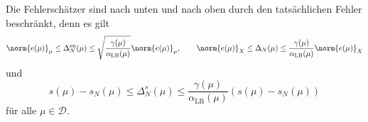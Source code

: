 \begin{Satz}
    Die Fehlerschätzer sind nach unten und nach oben durch den tatsächlichen Fehler beschränkt, denn es gilt
    \begin{equation}
        \norm{e(\mu)}_{\mu} \leq \Delta^{\text{en}}_N(\mu) \leq \sqrt{\frac{\gamma(\mu)}{\alpha_{\text{LB}}(\mu)}} \norm{e(\mu)}_{\mu}, \qquad
        \norm{e(\mu)}_X \leq \Delta_N(\mu) \leq \frac{\gamma(\mu)}{\alpha_{\text{LB}}(\mu)}\norm{e(\mu)}_X
    \end{equation}
    und
    \begin{equation}
         s(\mu) - s_N(\mu) \leq \Delta^s_N(\mu) \leq \frac{\gamma(\mu)}{\alpha_{\text{LB}}(\mu)} \left( s(\mu) - s_N(\mu) \right)
    \end{equation}
    für alle $\mu \in \mathcal D$.


\end{Satz}
